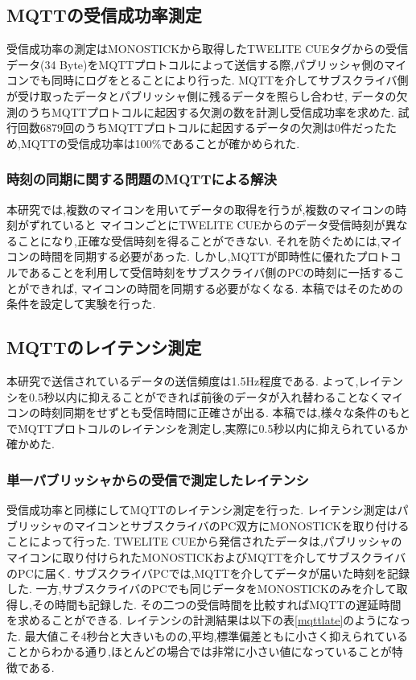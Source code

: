\subsection{MQTTの受信成功率測定}
受信成功率の測定はMONOSTICKから取得したTWELITE CUEタグからの受信データ(34 Byte)をMQTTプロトコルによって送信する際,パブリッシャ側のマイコンでも同時にログをとることにより行った.
MQTTを介してサブスクライバ側が受け取ったデータとパブリッシャ側に残るデータを照らし合わせ,
データの欠測のうちMQTTプロトコルに起因する欠測の数を計測し受信成功率を求めた.
試行回数6879回のうちMQTTプロトコルに起因するデータの欠測は0件だったため,MQTTの受信成功率は100\%であることが確かめられた.
\clearpage

\subsubsection{時刻の同期に関する問題のMQTTによる解決}
本研究では,複数のマイコンを用いてデータの取得を行うが,複数のマイコンの時刻がずれていると
マイコンごとにTWELITE CUEからのデータ受信時刻が異なることになり,正確な受信時刻を得ることができない.
それを防ぐためには,マイコンの時間を同期する必要があった.
しかし,MQTTが即時性に優れたプロトコルであることを利用して受信時刻をサブスクライバ側のPCの時刻に一括することができれば,
マイコンの時間を同期する必要がなくなる.
本稿ではそのための条件を設定して実験を行った.

\subsection{MQTTのレイテンシ測定}
本研究で送信されているデータの送信頻度は1.5Hz程度である.
よって,レイテンシを0.5秒以内に抑えることができれば前後のデータが入れ替わることなくマイコンの時刻同期をせずとも受信時間に正確さが出る.
本稿では,様々な条件のもとでMQTTプロトコルのレイテンシを測定し,実際に0.5秒以内に抑えられているか確かめた.

\subsubsection{単一パブリッシャからの受信で測定したレイテンシ}
受信成功率と同様にしてMQTTのレイテンシ測定を行った.
レイテンシ測定はパブリッシャのマイコンとサブスクライバのPC双方にMONOSTICKを取り付けることによって行った.
TWELITE CUEから発信されたデータは,パブリッシャのマイコンに取り付けられたMONOSTICKおよびMQTTを介してサブスクライバのPCに届く.
サブスクライバPCでは,MQTTを介してデータが届いた時刻を記録した.
一方,サブスクライバのPCでも同じデータをMONOSTICKのみを介して取得し,その時間も記録した.
その二つの受信時間を比較すればMQTTの遅延時間を求めることができる.
レイテンシの計測結果は以下の表\ref{mqttlate}のようになった.
最大値こそ4秒台と大きいものの,平均,標準偏差ともに小さく抑えられていることからわかる通り,ほとんどの場合では非常に小さい値になっていることが特徴である.

